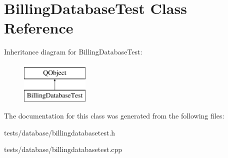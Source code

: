 \hypertarget{classBillingDatabaseTest}{\section{Billing\+Database\+Test Class Reference}
\label{classBillingDatabaseTest}
}
Inheritance diagram for Billing\+Database\+Test\+:\begin{figure}[H]
\begin{center}
\leavevmode
\includegraphics[height=2.000000cm]{d1/db1/classBillingDatabaseTest}
\end{center}
\end{figure}


The documentation for this class was generated from the following files\+:\begin{DoxyCompactItemize}
\item 
tests/database/billingdatabasetest.\+h\item 
tests/database/billingdatabasetest.\+cpp\end{DoxyCompactItemize}
